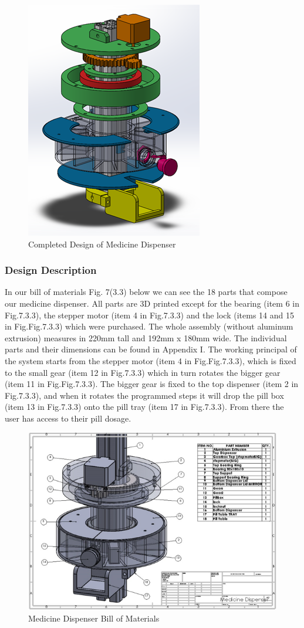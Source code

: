\documentclass[12pt]{article}
\begin{document}
\begin{figure}[H]
	\centering
	\includegraphics[width=0.5\linewidth]{M7.jpg}
	\caption{Completed Design of Medicine Dispenser}
\end{figure}
\subsubsection{Design Description}
In our bill of materials Fig. 7(3.3) below we can see the 18 parts that compose our medicine dispenser. All parts are 3D printed except for the bearing (item 6 in Fig.7.3.3), the stepper motor (item 4 in Fig.7.3.3) and the lock (items 14 and 15 in Fig.Fig.7.3.3) which were purchased. The whole assembly (without aluminum extrusion) measures in 220mm tall and 192mm x 180mm wide. The individual parts and their dimensions can be found in Appendix I. The working principal of the system starts from the stepper motor (item 4 in Fig.Fig.7.3.3), which is fixed to the small gear (item 12 in Fig.7.3.3) which in turn rotates the bigger gear (item 11 in Fig.Fig.7.3.3). The bigger gear is fixed to the top dispenser (item 2 in Fig.7.3.3), and when it rotates the programmed steps it will drop the pill box (item 13 in Fig.7.3.3) onto the pill tray (item 17 in Fig.7.3.3). From there the user has access to their pill dosage.
\begin{figure}[H]
	\centering
	\includegraphics[width=0.7\linewidth]{M8.png}
	\caption{Medicine Dispenser Bill of Materials }
\end{figure}
\end{document}
